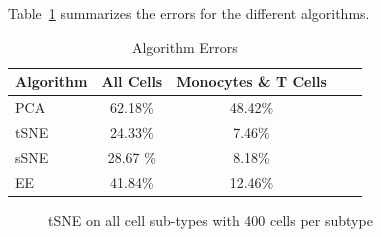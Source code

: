 \documentclass{article}
\begin{document}
Table~\ref{tableErrors} summarizes the errors for the different algorithms.
\begin{table}[h!]
\caption{Algorithm Errors}
\label{tableErrors}
\begin{center}
\begin{small}
\begin{sc}
\begin{tabular}{lcccr}
\hline
\abovespace\belowspace
Algorithm & All Cells & Monocytes \& T Cells \\
\hline
\abovespace
PCA	& 62.18\% & 48.42\%  \\
tSNE 	& 24.33\%  & 7.46\%\\ 
sSNE	& 28.67 \%  & 8.18\%\\
\belowspace
EE		& 41.84\% &12.46\% \\
\hline
\end{tabular}
\end{sc}
\end{small}
\end{center}
\vskip -0.1in
\end{table}


\begin{figure}[h!]
\begin{center}
\quad
{}\quad
\end{center}
\caption{tSNE on all cell sub-types with 400 cells per subtype}
\label{tSNEall}
\vskip -0.2in
\end{figure}
\end{document}
